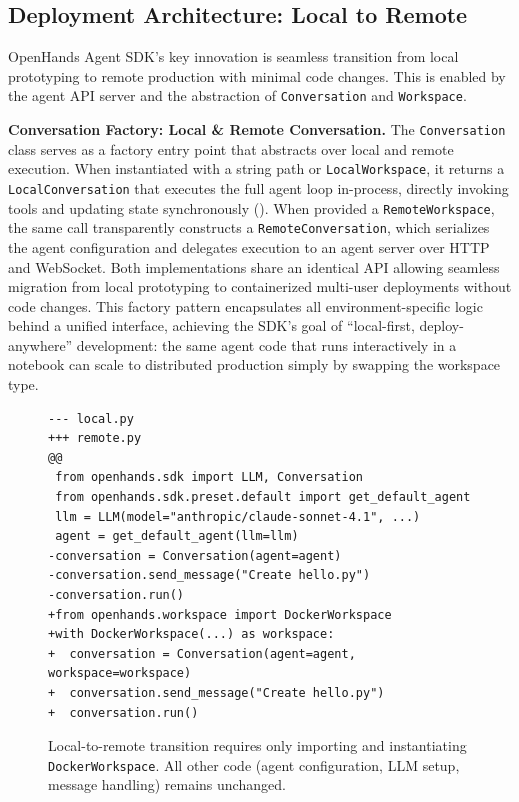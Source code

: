 \subsection{Deployment Architecture: Local to Remote}
\label{sec:deployment}

OpenHands Agent SDK's key innovation is seamless transition from local prototyping to remote production with minimal code changes. 
This is enabled by the agent API server and the abstraction of \texttt{Conversation} and \texttt{Workspace}.

\textbf{Conversation Factory: Local \& Remote Conversation.}
The \texttt{Conversation} class serves as a factory entry point that abstracts over local and remote execution. When instantiated with a string path or \texttt{LocalWorkspace}, it returns a \texttt{LocalConversation} that executes the full agent loop in-process, directly invoking tools and updating state synchronously ().
% 
When provided a \texttt{RemoteWorkspace}, the same call transparently constructs a \texttt{RemoteConversation}, which serializes the agent configuration and delegates execution to an agent server over HTTP and WebSocket. 
% 
Both implementations share an identical API allowing seamless migration from local prototyping to containerized multi-user deployments without code changes. This factory pattern encapsulates all environment-specific logic behind a unified interface, achieving the SDK’s goal of “local-first, deploy-anywhere” development: the same agent code that runs interactively in a notebook can scale to distributed production simply by swapping the workspace type.


\begin{figure}[!h]
\centering
\begin{verbatim}
--- local.py
+++ remote.py
@@
 from openhands.sdk import LLM, Conversation
 from openhands.sdk.preset.default import get_default_agent
 llm = LLM(model="anthropic/claude-sonnet-4.1", ...)
 agent = get_default_agent(llm=llm)
-conversation = Conversation(agent=agent)
-conversation.send_message("Create hello.py")
-conversation.run()
+from openhands.workspace import DockerWorkspace
+with DockerWorkspace(...) as workspace:
+  conversation = Conversation(agent=agent, workspace=workspace)
+  conversation.send_message("Create hello.py")
+  conversation.run()
\end{verbatim}
\caption{Local-to-remote transition requires only importing and instantiating \texttt{DockerWorkspace}. All other code (agent configuration, LLM setup, message handling) remains unchanged.}
\label{fig:local-remote-code}
\end{figure}


